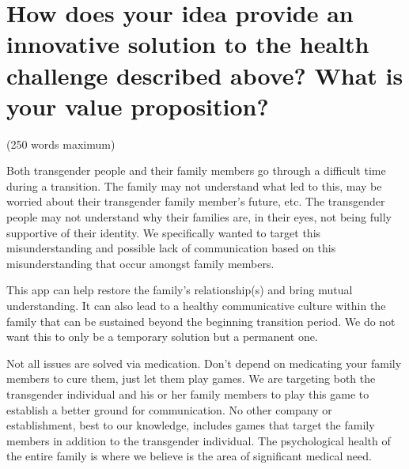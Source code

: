 \section{How does your idea provide an innovative solution to the health challenge described above? 
What is your value proposition?}

(250 words maximum)    

Both transgender people and their family members go through a difficult time during a transition. The family may not understand what led to this, may be worried about their transgender family member's future, etc. The transgender people may not understand why their families are, in their eyes, not being fully supportive of their identity. We specifically wanted to target this misunderstanding and possible lack of communication based on this misunderstanding that occur amongst family members. 

This app can help restore the family's relationship(s) and bring mutual understanding. It can also lead to a healthy communicative culture within the family that can be sustained beyond the beginning transition period. We do not want this to only be a temporary solution but a permanent one. 

Not all issues are solved via medication. Don't depend on medicating your family members to cure them, just let them play games. We are targeting both the transgender individual and his or her family members to play this game to establish a better ground for communication. No other company or establishment, best to our knowledge, includes games that target the family members in addition to the transgender individual. The psychological health of the entire family is where we believe is the area of significant medical need. 


